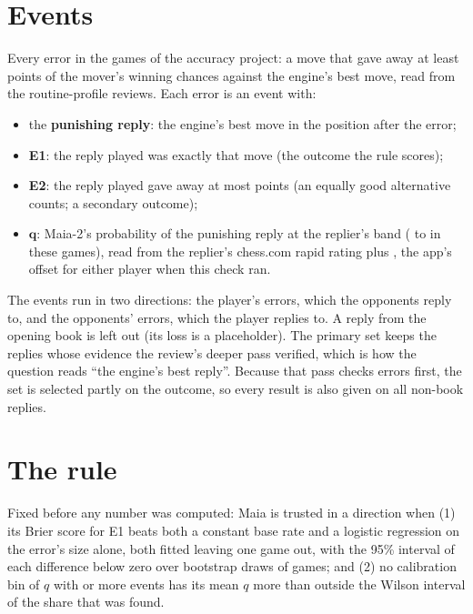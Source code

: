 \documentclass[11pt]{article}
\begin{document}
\section{Events}

Every error in the \Games{} games of the accuracy project: a move that gave away at least
\ErrorAt{} points of the mover's winning chances against the engine's best move, read from the
routine-profile reviews. Each error is an event with:

\begin{itemize}[nosep]
\item the \textbf{punishing reply}: the engine's best move in the position after the error;
\item \textbf{E1}: the reply played was exactly that move (the outcome the rule scores);
\item \textbf{E2}: the reply played gave away at most \EAt{} points (an equally good alternative
counts; a secondary outcome);
\item $\boldsymbol{q}$: Maia-2's probability of the punishing reply at the replier's band
(\BandMin{} to \BandMax{} in these games), read from the replier's chess.com rapid rating plus
\PlayerOffset, the app's offset for either player when this check ran.
\end{itemize}

The events run in two directions: the player's errors, which the opponents reply to, and the
opponents' errors, which the player replies to. A reply from the opening book is left out (its
loss is a placeholder). The primary set keeps the \ExactEvents{} replies whose evidence the
review's deeper pass verified, which is how the question reads ``the engine's best reply''.
Because that pass checks errors first, the set is selected partly on the outcome, so every result
is also given on all \Events{} non-book replies.

\section{The rule}

Fixed before any number was computed: Maia is trusted in a direction when (1) its Brier score for
E1 beats both a constant base rate and a logistic regression on the error's size alone, both
fitted leaving one game out, with the 95\% interval of each difference below zero over \Draws{}
bootstrap draws of games; and (2) no calibration bin of $q$ with \BinMin{} or more events has its
mean $q$ more than \BinGap{} outside the Wilson interval of the share that was found.
\end{document}
